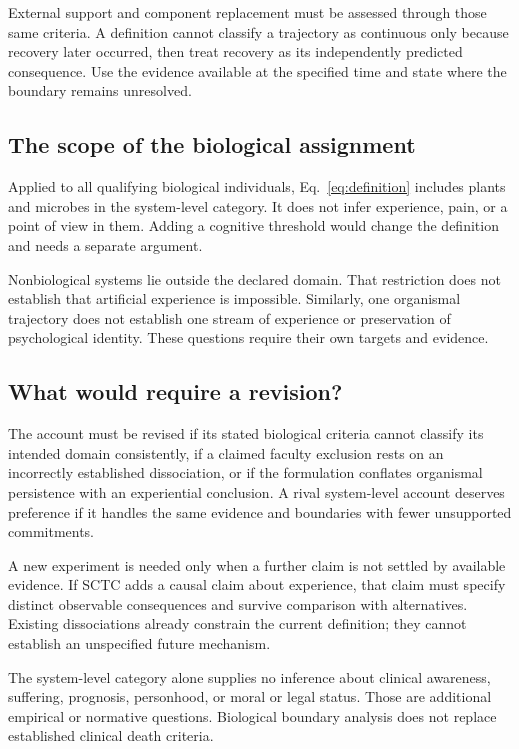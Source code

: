 \documentclass[11pt,letterpaper]{article}
\begin{document}
External support and component replacement must be assessed through those same criteria. A definition cannot classify a trajectory as continuous only because recovery later occurred, then treat recovery as its independently predicted consequence. Use the evidence available at the specified time and state where the boundary remains unresolved.

\subsection*{The scope of the biological assignment}
Applied to all qualifying biological individuals, Eq.~\ref{eq:definition} includes plants and microbes in the system-level category. It does not infer experience, pain, or a point of view in them. Adding a cognitive threshold would change the definition and needs a separate argument.

Nonbiological systems lie outside the declared domain. That restriction does not establish that artificial experience is impossible. Similarly, one organismal trajectory does not establish one stream of experience or preservation of psychological identity. These questions require their own targets and evidence.

\subsection*{What would require a revision?}
The account must be revised if its stated biological criteria cannot classify its intended domain consistently, if a claimed faculty exclusion rests on an incorrectly established dissociation, or if the formulation conflates organismal persistence with an experiential conclusion. A rival system-level account deserves preference if it handles the same evidence and boundaries with fewer unsupported commitments.

A new experiment is needed only when a further claim is not settled by available evidence. If SCTC adds a causal claim about experience, that claim must specify distinct observable consequences and survive comparison with alternatives. Existing dissociations already constrain the current definition; they cannot establish an unspecified future mechanism.

The system-level category alone supplies no inference about clinical awareness, suffering, prognosis, personhood, or moral or legal status. Those are additional empirical or normative questions. Biological boundary analysis does not replace established clinical death criteria.
\end{document}
